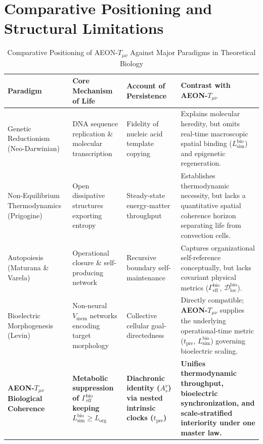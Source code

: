 \documentclass[11pt,a4paper]{article}
\begin{document}
\section{Comparative Positioning and Structural Limitations}

\begin{table}[htbp]
\centering
\caption{Comparative Positioning of AEON-$T_{\mu\nu}$ Against Major Paradigms in Theoretical Biology}
\label{tab:bio_comparison}
\small
\begin{tabularx}{\textwidth}{>{\raggedright\arraybackslash}p{2.8cm} >{\raggedright\arraybackslash}p{3.1cm} >{\raggedright\arraybackslash}p{3.1cm} >{\raggedright\arraybackslash}X}
\toprule
\textbf{Paradigm} & \textbf{Core Mechanism of Life} & \textbf{Account of Persistence} & \textbf{Contrast with AEON-$T_{\mu\nu}$} \\
\midrule
Genetic Reductionism (Neo-Darwinian) & DNA sequence replication \& molecular transcription & Fidelity of nucleic acid template copying & Explains molecular heredity, but omits real-time macroscopic spatial binding ($L_{\mathrm{sim}}^{\mathrm{bio}}$) and epigenetic regeneration. \\
\addlinespace
Non-Equilibrium Thermodynamics (Prigogine) & Open dissipative structures exporting entropy & Steady-state energy-matter throughput & Establishes thermodynamic necessity, but lacks a quantitative spatial coherence horizon separating life from convection cells. \\
\addlinespace
Autopoiesis (Maturana \& Varela) & Operational closure \& self-producing network & Recursive boundary self-maintenance & Captures organizational self-reference conceptually, but lacks covariant physical metrics ($\Gamma_{\mathrm{eff}}^{\mathrm{bio}}$, $\mathcal{D}_{\mathrm{loc}}^{\mathrm{bio}}$). \\
\addlinespace
Bioelectric Morphogenesis (Levin) & Non-neural $V_{\mathrm{mem}}$ networks encoding target morphology & Collective cellular goal-directedness & Directly compatible; \textbf{AEON-$T_{\mu\nu}$} supplies the underlying operational-time metric ($t_{\mathrm{pre}}$, $L_{\mathrm{sim}}^{\mathrm{bio}}$) governing bioelectric scaling. \\
\addlinespace
\textbf{AEON-$T_{\mu\nu}$ Biological Coherence} & \textbf{Metabolic suppression of $\Gamma_{\mathrm{eff}}^{\mathrm{bio}}$ keeping $L_{\mathrm{sim}}^{\mathrm{bio}} \ge L_{\mathrm{org}}$} & \textbf{Diachronic identity ($A_s^v$) via nested intrinsic clocks ($t_{\mathrm{pre}}$)} & \textbf{Unifies thermodynamic throughput, bioelectric synchronization, and scale-stratified interiority under one master law.} \\
\bottomrule
\end{tabularx}
\end{table}
\end{document}
